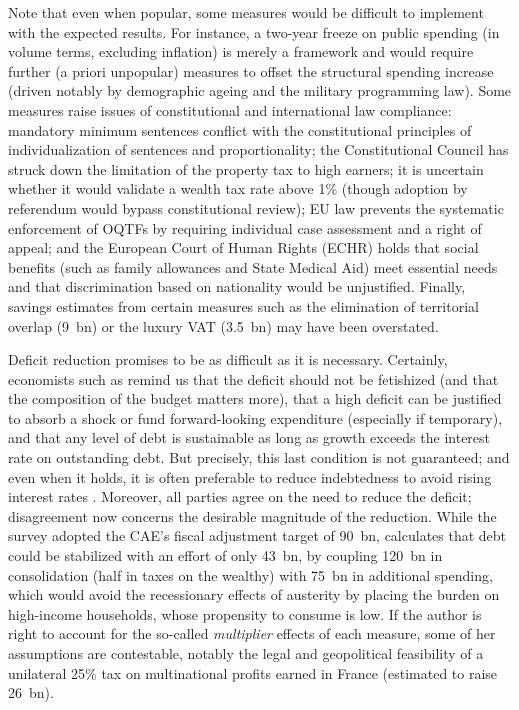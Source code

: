 \documentclass[12pt,english]{article}
\begin{document}
Note that even when popular, some measures would be difficult to implement with the expected results. For instance, a two-year freeze on public spending (in volume terms, excluding inflation) is merely a framework and would require further (a priori unpopular) measures to offset the structural spending increase (driven notably by demographic ageing and the military programming law). Some measures raise issues of constitutional and international law compliance: mandatory minimum sentences conflict with the constitutional principles of individualization of sentences and proportionality; the Constitutional Council has struck down the limitation of the property tax to high earners; it is uncertain whether it would validate a wealth tax rate above 1\% (though adoption by referendum would bypass constitutional review); EU law prevents the systematic enforcement of OQTFs by requiring individual case assessment and a right of appeal; and the European Court of Human Rights (ECHR) holds that social benefits (such as family allowances and State Medical Aid) meet essential needs and that discrimination based on nationality would be unjustified. Finally, savings estimates from certain measures such as the elimination of territorial overlap (9~bn) or the luxury VAT (3.5~bn) may have been overstated.

Deficit reduction promises to be as difficult as it is necessary.
Certainly, economists such as \cite{geerolf_dette_2021} remind us that the deficit should not be fetishized (and that the composition of the budget matters more), that a high deficit can be justified to absorb a shock or fund forward-looking expenditure (especially if temporary), and that any level of debt is sustainable as long as growth exceeds the interest rate on outstanding debt. But precisely, this last condition is not guaranteed; and even when it holds, it is often preferable to reduce indebtedness to avoid rising interest rates \citep{mian_goldilocks_2025}. Moreover, all parties agree on the need to reduce the deficit; disagreement now concerns the desirable magnitude of the reduction. While the survey adopted the CAE's fiscal adjustment target of 90~bn, \cite{delatte_redresser_2025} calculates that debt could be stabilized with an effort of only 43~bn,
by coupling 120~bn in consolidation (half in taxes on the wealthy) with 75~bn in additional spending, which would avoid the recessionary effects of austerity by placing the burden on high-income households, whose propensity to consume is low.
If the author is right to account for the so-called \textit{multiplier} effects of each measure, some of her assumptions are contestable, notably the legal and geopolitical feasibility of a unilateral 25\% tax on multinational profits earned in France (estimated to raise 26~bn).
\end{document}
